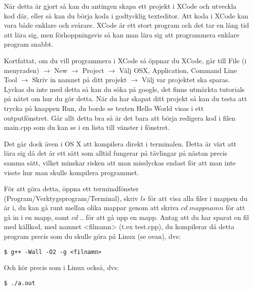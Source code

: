 När detta är gjort så kan du antingen skapa ett projekt i XCode och utveckla kod där, eller så kan du börja koda i godtycklig texteditor.
Att koda i XCode kan vara både enklare och svårare. XCode är ett stort program och det tar en lång tid att lära sig, men förhoppningsvis så kan man lära sig att programmera enklare program snabbt.

Kortfattat, om du vill programmera i XCode så öppnar du XCode, går till File (i menyraden) $\rightarrow$ New $\rightarrow$ Project $\rightarrow$ Välj OSX, Application, Command Line Tool $\rightarrow$ Skriv in namnet på ditt projekt $\rightarrow$ Välj var projektet ska sparas. Lyckas du inte med detta så kan du söka på google, det finns utmärkta tutorials på nätet om hur du gör detta. När du har skapat ditt projekt så kan du testa att trycka på knappen Run, du borde se texten Hello World visas i ett outputfönstret. Går allt detta bra så är det bara att börja redigera kod i filen main.cpp som du kan se i en lista till vänster i fönstret.

Det går dock även i OS X att kompilera direkt i terminalen. Detta är värt att lära sig då det är ett sätt som alltid fungerar på tävlingar på nästan precis samma sätt, vilket minskar risken att man misslyckas endast för att man inte visste hur man skulle kompilera programmet.

För att göra detta, öppna ett terminalfönster (Program/Verktygsprogram/Terminal), skriv $ls$ för att visa alla filer i mappen du är i, du kan gå runt mellan olika mappar genom att skriva $cd \;mappnamn$ för att gå in i en mapp, samt $cd \;..$ för att gå upp en mapp.
Antag att du har sparat en fil med källkod, med namnet <filnamn> (t.ex test.cpp), du kompilerar då detta program precis som du skulle göra på Linux (se ovan), dvs:

\texttt{\$ g++ -Wall -O2 -g <filnamn>}

Och kör precis som i Linux också, dvs:

\texttt{\$ ./a.out}
